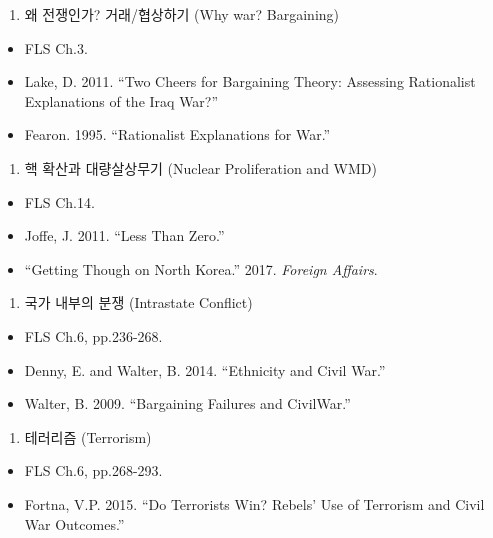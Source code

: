 \documentclass[]{book}
\providecommand{\tightlist}{%
  \setlength{\itemsep}{0pt}\setlength{\parskip}{0pt}}
\begin{document}
\begin{enumerate}
\def\labelenumi{\arabic{enumi}.}
\setcounter{enumi}{6}
\tightlist
\item
  왜 전쟁인가? 거래/협상하기 (Why war? Bargaining)
\end{enumerate}

\begin{itemize}
\tightlist
\item
  FLS Ch.3.
\item
  Lake, D. 2011. ``Two Cheers for Bargaining Theory: Assessing Rationalist Explanations of the Iraq War?''
\item
  Fearon. 1995. ``Rationalist Explanations for War.''
\end{itemize}

\begin{enumerate}
\def\labelenumi{\arabic{enumi}.}
\setcounter{enumi}{7}
\tightlist
\item
  핵 확산과 대량살상무기 (Nuclear Proliferation and WMD)
\end{enumerate}

\begin{itemize}
\tightlist
\item
  FLS Ch.14.
\item
  Joffe, J. 2011. ``Less Than Zero.''
\item
  ``Getting Though on North Korea.'' 2017. \emph{Foreign Affairs}.
\end{itemize}

\begin{enumerate}
\def\labelenumi{\arabic{enumi}.}
\setcounter{enumi}{8}
\tightlist
\item
  국가 내부의 분쟁 (Intrastate Conflict)
\end{enumerate}

\begin{itemize}
\tightlist
\item
  FLS Ch.6, pp.236-268.
\item
  Denny, E. and Walter, B. 2014. ``Ethnicity and Civil War.''
\item
  Walter, B. 2009. ``Bargaining Failures and CivilWar.''
\end{itemize}

\begin{enumerate}
\def\labelenumi{\arabic{enumi}.}
\setcounter{enumi}{9}
\tightlist
\item
  테러리즘 (Terrorism)
\end{enumerate}

\begin{itemize}
\tightlist
\item
  FLS Ch.6, pp.268-293.
\item
  Fortna, V.P. 2015. ``Do Terrorists Win? Rebels' Use of Terrorism and Civil War Outcomes.''
\end{itemize}
\end{document}
